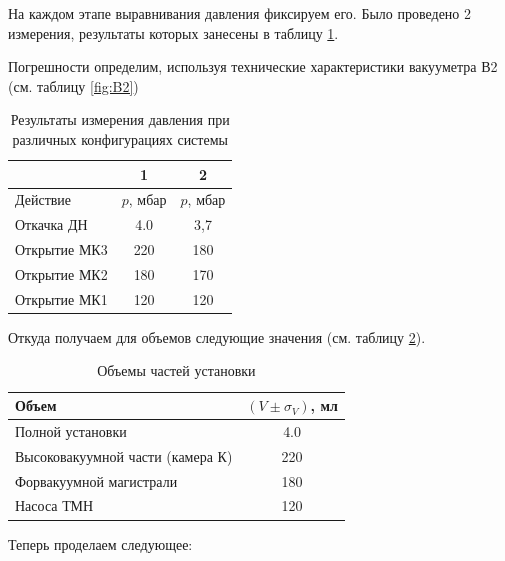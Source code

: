 \documentclass[12pt,a4paper]{article}
\begin{document}
На каждом этапе выравнивания давления фиксируем его. Было проведено 2 измерения, результаты которых занесены в таблицу \ref{tab:press}.

Погрешности определим, используя технические характеристики вакууметра В2 (см. таблицу \ref{fig:B2})



\begin{table}[h]
	\caption{Результаты измерения давления при различных конфигурациях системы}
	\label{tab:press}
	\begin{center}
		\begin{tabular}{lcc}
			\toprule
			{ } & 1 & 2 \\ \midrule
			Действие & $p$, мбар & $p$, мбар  \\ \midrule
			Откачка ДН           & 4.0            & 3,7          	   \\ 
			Открытие МК3         & 220            & 180             \\ 
			Открытие МК2         & 180            & 170             \\ 
			Открытие МК1         & 120            & 120            \\ 
			\bottomrule
		\end{tabular}
	\end{center}
\end{table}


Откуда получаем для объемов следующие значения (см. таблицу \ref{tab:volumes}).
\begin{table}[H]
	\caption{Объемы частей установки}
	\label{tab:volumes}
	\begin{center}
		\begin{tabular}{lc}
			\toprule
			Объем & $(V \pm \sigma_V)$, мл\\ \midrule
			Полной установки           & 4.0  \\ 
			Высоковакуумной части (камера К)         & 220 \\ 
			Форвакуумной магистрали         & 180 \\ 
			Насоса ТМН         & 120 \\ 
			\bottomrule
		\end{tabular}
	\end{center}
\end{table}



Теперь проделаем следующее:
\end{document}
